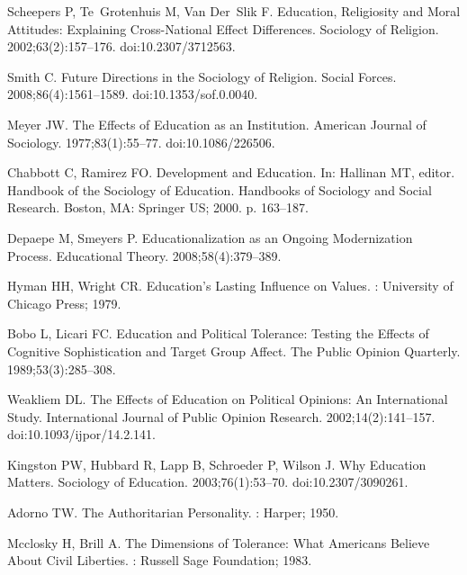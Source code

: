 \documentclass[10pt,letterpaper]{article}
\begin{document}
\begin{thebibliography}{10}
Scheepers P, Te~Grotenhuis M, Van Der~Slik F.
\newblock Education, {{Religiosity}} and {{Moral Attitudes}}: {{Explaining
  Cross}}-{{National Effect Differences}}.
\newblock Sociology of Religion. 2002;63(2):157--176.
\newblock doi:{10.2307/3712563}.

Smith C.
\newblock Future {{Directions}} in the {{Sociology}} of {{Religion}}.
\newblock Social Forces. 2008;86(4):1561--1589.
\newblock doi:{10.1353/sof.0.0040}.

Meyer JW.
\newblock The {{Effects}} of {{Education}} as an {{Institution}}.
\newblock American Journal of Sociology. 1977;83(1):55--77.
\newblock doi:{10.1086/226506}.

Chabbott C, Ramirez FO.
\newblock Development and {{Education}}.
\newblock In: Hallinan MT, editor. Handbook of the {{Sociology}} of
  {{Education}}. Handbooks of {{Sociology}} and {{Social Research}}. {Boston,
  MA}: {Springer US}; 2000. p. 163--187.

Depaepe M, Smeyers P.
\newblock Educationalization as an {{Ongoing Modernization Process}}.
\newblock Educational Theory. 2008;58(4):379--389.

Hyman HH, Wright CR.
\newblock Education's {{Lasting Influence}} on {{Values}}.
: {University of Chicago Press}; 1979.

Bobo L, Licari FC.
\newblock Education and {{Political Tolerance}}: {{Testing}} the {{Effects}} of
  {{Cognitive Sophistication}} and {{Target Group Affect}}.
\newblock The Public Opinion Quarterly. 1989;53(3):285--308.

Weakliem DL.
\newblock The {{Effects}} of {{Education}} on {{Political Opinions}}: {{An
  International Study}}.
\newblock International Journal of Public Opinion Research.
  2002;14(2):141--157.
\newblock doi:{10.1093/ijpor/14.2.141}.

Kingston PW, Hubbard R, Lapp B, Schroeder P, Wilson J.
\newblock Why {{Education Matters}}.
\newblock Sociology of Education. 2003;76(1):53--70.
\newblock doi:{10.2307/3090261}.

Adorno TW.
\newblock The {{Authoritarian Personality}}.
: {Harper}; 1950.

Mcclosky H, Brill A.
\newblock The {{Dimensions}} of {{Tolerance}}: {{What Americans Believe About
  Civil Liberties}}.
: {Russell Sage Foundation}; 1983.


\end{thebibliography}
\end{document}
